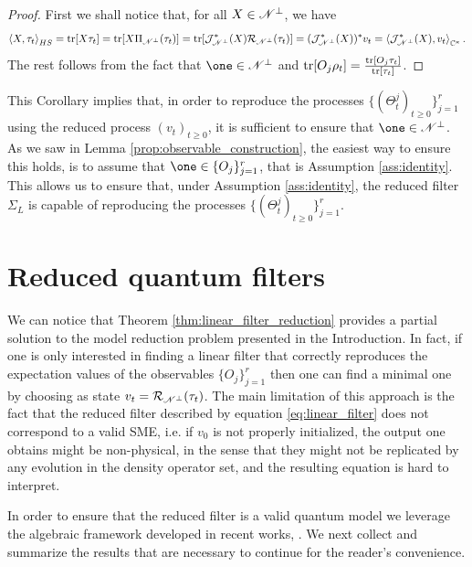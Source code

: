 \documentclass[aihp,12pt]{imsart}
\begin{document}
\begin{proof}
    First we shall notice that, for all $X\in\mathscr{N}^\perp$, we have \[\left< X,\tau_t \right>_{HS} = {\rm tr}[X\tau_t] = {\rm tr}[X \Pi_{\mathscr{N}^\perp}(\tau_t)] = {\rm tr}[\mathcal{J}^*_{\mathscr{N}^\perp}(X) \mathcal{R}_{\mathscr{N}^\perp}(\tau_t)] = (\mathcal{J}^*_{\mathscr{N}^\perp}(X))^* v_t = \left< \mathcal{J}^*_{\mathscr{N}^\perp}(X),v_t \right>_{\mathbb{C}^\kappa}.\] The rest follows from the fact that $\one\in\Ns^\perp$ and ${\rm tr}[O_j\rho_t] = \frac{{\rm tr}[O_j\tau_t]}{{\rm tr}[\tau_t]}$. 
\end{proof}

This Corollary implies that, in order to reproduce the processes $\{(\Theta_t^j)_{t\geq0}\}_{j=1}^r$ using the reduced process $(v_t)_{t\geq0}$, it is sufficient to ensure that $\one\in\Ns^\perp$. As we saw in Lemma \ref{prop:observable_construction}, the easiest way to ensure this holds, is to assume that $\one\in\{O_j\}_{j=1}^r$, that is Assumption \ref{ass:identity}. This allows us to ensure that, under Assumption \ref{ass:identity}, the reduced filter $\Sigma_L$ is capable of reproducing the processes $\{(\Theta_t^j)_{t\geq0}\}_{j=1}^r$.
 
\section{Reduced quantum filters}
\label{sec:reduced_quantum_filters}
We can notice that Theorem \ref{thm:linear_filter_reduction} provides a partial solution to the model reduction problem presented in the Introduction. In fact, if one is only interested in finding a linear filter that correctly reproduces the expectation values of the observables $\{O_j\}_{j=1}^r$ then one can find a minimal one by choosing as state $v_t=\mathcal{R}_{\mathscr{N}^\perp}(\tau_t)$. 
The main limitation of this approach is the fact that the reduced filter described by equation \eqref{eq:linear_filter}  does not correspond to a valid SME, i.e. if $v_0$ is not properly initialized, the output one obtains might be non-physical, in the sense that they might not be replicated by any evolution in the density operator set, and the resulting equation is hard to interpret.

In order to ensure that the reduced filter is a valid quantum model we leverage the algebraic framework developed in recent works, \cite{tit2023, letter2024, prxq2024}. We next collect and summarize the results that are necessary to continue for the reader's convenience.
\end{document}
